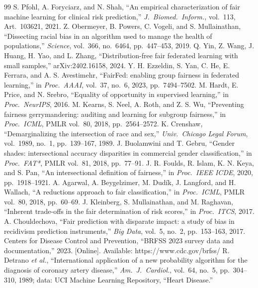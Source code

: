 \begin{thebibliography}{99}
 S. Pfohl, A. Foryciarz, and N. Shah, ``An empirical characterization of fair machine learning for clinical risk prediction,'' \emph{J.\ Biomed.\ Inform.}, vol.~113, Art.\ 103621, 2021.
 Z. Obermeyer, B. Powers, C. Vogeli, and S. Mullainathan, ``Dissecting racial bias in an algorithm used to manage the health of populations,'' \emph{Science}, vol.~366, no.~6464, pp.~447--453, 2019.
 Q. Yin, Z. Wang, J. Huang, H. Yao, and L. Zhang, ``Distribution-free fair federated learning with small samples,'' arXiv:2402.16158, 2024.
 Y. H. Ezzeldin, S. Yan, C. He, E. Ferrara, and A. S. Avestimehr, ``FairFed: enabling group fairness in federated learning,'' in \emph{Proc.\ AAAI}, vol.~37, no.~6, 2023, pp.~7494--7502.
 M. Hardt, E. Price, and N. Srebro, ``Equality of opportunity in supervised learning,'' in \emph{Proc.\ NeurIPS}, 2016.
 M. Kearns, S. Neel, A. Roth, and Z. S. Wu, ``Preventing fairness gerrymandering: auditing and learning for subgroup fairness,'' in \emph{Proc.\ ICML}, PMLR vol.~80, 2018, pp.~2564--2572.
 K. Crenshaw, ``Demarginalizing the intersection of race and sex,'' \emph{Univ.\ Chicago Legal Forum}, vol.~1989, no.~1, pp.~139--167, 1989.
 J. Buolamwini and T. Gebru, ``Gender shades: intersectional accuracy disparities in commercial gender classification,'' in \emph{Proc.\ FAT*}, PMLR vol.~81, 2018, pp.~77--91.
 J. R. Foulds, R. Islam, K. N. Keya, and S. Pan, ``An intersectional definition of fairness,'' in \emph{Proc.\ IEEE ICDE}, 2020, pp.~1918--1921.
 A. Agarwal, A. Beygelzimer, M. Dud\'ik, J. Langford, and H. Wallach, ``A reductions approach to fair classification,'' in \emph{Proc.\ ICML}, PMLR vol.~80, 2018, pp.~60--69.
 J. Kleinberg, S. Mullainathan, and M. Raghavan, ``Inherent trade-offs in the fair determination of risk scores,'' in \emph{Proc.\ ITCS}, 2017.
 A. Chouldechova, ``Fair prediction with disparate impact: a study of bias in recidivism prediction instruments,'' \emph{Big Data}, vol.~5, no.~2, pp.~153--163, 2017.
 Centers for Disease Control and Prevention, ``BRFSS 2023 survey data and documentation,'' 2023. [Online]. Available: https://www.cdc.gov/brfss/
 R. Detrano \emph{et al.}, ``International application of a new probability algorithm for the diagnosis of coronary artery disease,'' \emph{Am.\ J.\ Cardiol.}, vol.~64, no.~5, pp.~304--310, 1989; data: UCI Machine Learning Repository, ``Heart Disease.''
\end{thebibliography}

